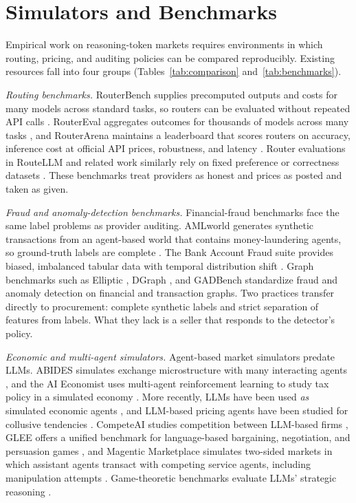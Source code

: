 \documentclass[sigconf]{acmart}
\begin{document}
\section{Simulators and Benchmarks}\label{simulators-and-benchmarks}

Empirical work on reasoning-token markets requires environments in which routing, pricing, and auditing policies can be compared reproducibly. Existing resources fall into four groups (Tables~\ref{tab:comparison} and~\ref{tab:benchmarks}).

\emph{Routing benchmarks.} RouterBench supplies precomputed outputs and costs for many models across standard tasks, so routers can be evaluated without repeated API calls \cite{hu2024routerbench}. RouterEval aggregates outcomes for thousands of models across many tasks \cite{huang2025routereval}, and RouterArena maintains a leaderboard that scores routers on accuracy, inference cost at official API prices, robustness, and latency \cite{lu2025routerarena}. Router evaluations in RouteLLM and related work similarly rely on fixed preference or correctness datasets \cite{ong2025routellm, shnitzer2023routing}. These benchmarks treat providers as honest and prices as posted and taken as given.

\emph{Fraud and anomaly-detection benchmarks.} Financial-fraud benchmarks face the same label problems as provider auditing. AMLworld generates synthetic transactions from an agent-based world that contains money-laundering agents, so ground-truth labels are complete \cite{altman2023amlworld}. The Bank Account Fraud suite provides biased, imbalanced tabular data with temporal distribution shift \cite{jesus2022baf}. Graph benchmarks such as Elliptic \cite{weber2019elliptic}, DGraph \cite{huang2022dgraph}, and GADBench \cite{tang2023gadbench} standardize fraud and anomaly detection on financial and transaction graphs. Two practices transfer directly to procurement: complete synthetic labels and strict separation of features from labels. What they lack is a seller that responds to the detector's policy.

\emph{Economic and multi-agent simulators.} Agent-based market simulators predate LLMs. ABIDES simulates exchange microstructure with many interacting agents \cite{byrd2020abides}, and the AI Economist uses multi-agent reinforcement learning to study tax policy in a simulated economy \cite{zheng2022aieconomist}. More recently, LLMs have been used \emph{as} simulated economic agents \cite{horton2023homosilicus, park2023generative, li2024econagent}, and LLM-based pricing agents have been studied for collusive tendencies \cite{fish2024collusion}. CompeteAI studies competition between LLM-based firms \cite{zhao2024competeai}, GLEE offers a unified benchmark for language-based bargaining, negotiation, and persuasion games \cite{shapira2024glee}, and Magentic Marketplace simulates two-sided markets in which assistant agents transact with competing service agents, including manipulation attempts \cite{bansal2025magentic}. Game-theoretic benchmarks evaluate LLMs' strategic reasoning \cite{duan2024gtbench}.
\end{document}
